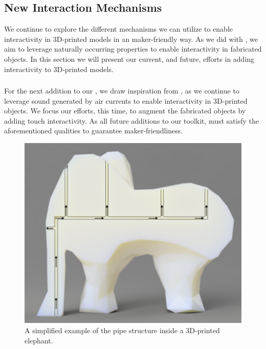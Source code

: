     \subsection{New Interaction Mechanisms}
      We continue to explore the different mechanisms we can utilize to enable
      interactivity in 3D-printed models in an maker-friendly way. As we did
      with \bh, we aim to leverage naturally occurring properties to enable
      interactivity in fabricated objects. In this section we will present our
      current, and future, efforts in adding interactivity to 3D-printed
      models.

      \subsubsection{\at}
        For the next addition to our \itoolkit, we draw inspiration from \bh,
        as we continue to leverage sound generated by air currents to enable
        interactivity in 3D-printed objects. We focus our efforts, this time,
        to augment the fabricated objects by adding touch interactivity. As all
        future additions to our toolkit, \at must satisfy the aforementioned
        qualities to guarantee maker-friendliness.

        \begin{figure}
          \centering
            \includegraphics[width=.9\columnwidth]{figures/elephant-airtouch.png}
            \caption{A simplified example of the pipe structure inside a
              3D-printed elephant.}
            \label{fig:elephant-airtouch}
        \end{figure}


